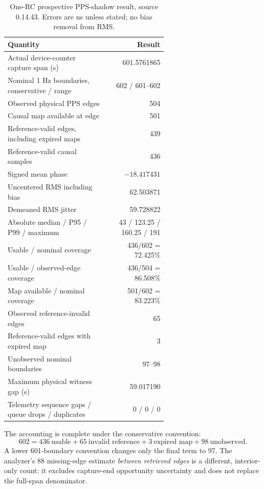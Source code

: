 \documentclass[11pt,letterpaper]{article}
\begin{document}
\begin{table}[htbp]\centering\small
\caption{One-RC prospective PPS-shadow result, source 0.14.43. Errors are ns unless stated; no bias removal from RMS.}\label{tab:main}
\begin{tabular}{@{}L{0.62\linewidth}r@{}}\toprule
Quantity & Result\\\midrule
Actual device-counter capture span (s)&601.5761865\\
Nominal 1 Hz boundaries, conservative / range&602 / 601--602\\
Observed physical PPS edges&504\\
Causal map available at edge&501\\
Reference-valid edges, including expired maps&439\\
Reference-valid causal samples&436\\
Signed mean phase&$-18.417431$\\
Uncentered RMS including bias&62.503871\\
Demeaned RMS jitter&59.728822\\
Absolute median / P95 / P99 / maximum&43 / 123.25 / 160.25 / 191\\\midrule
Usable / nominal coverage&436/602 = 72.425\%\\
Usable / observed-edge coverage&436/504 = 86.508\%\\
Map available / nominal coverage&501/602 = 83.223\%\\
Observed reference-invalid edges&65\\
Reference-valid edges with expired map&3\\
Unobserved nominal boundaries&97--98\\
Maximum physical witness gap (s)&59.017190\\
Telemetry sequence gaps / queue drops / duplicates&0 / 0 / 0\\\bottomrule
\end{tabular}
\end{table}

The accounting is complete under the conservative convention:
\begin{equation}
 602=436\ \text{usable}+65\ \text{invalid reference}
       +3\ \text{expired map}+98\ \text{unobserved}.\label{eq:denom}
\end{equation}
A lower 601-boundary convention changes only the final term to 97. The analyzer's 88 missing-edge estimate \emph{between retrieved edges} is a different, interior-only count; it excludes capture-end opportunity uncertainty and does not replace the full-span denominator.
\end{document}
